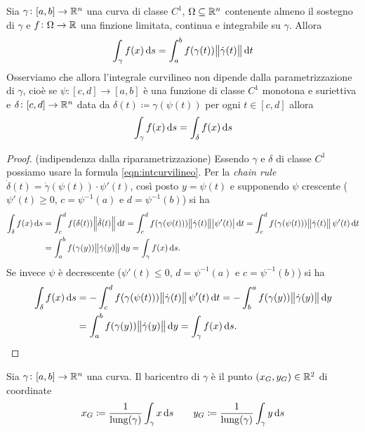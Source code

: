 \begin{thm}
	Sia $ \gamma \colon [a, b] \to \mathbb{R}^n $ una curva di classe $ C^1 $, $ \Omega \subseteq \mathbb{R}^n $ contenente almeno il sostegno di $ \gamma $ e $ f \colon \Omega \to \mathbb{R} $ una finzione limitata, continua e integrabile su $ \gamma $. Allora
	\begin{equation} \label{eqn:intcurvilineo}
		\int_{\gamma} f(x) \dif{s} = \int_{a}^{b} f(\gamma(t)) \norm{\dot{\gamma}(t)} \dif{t}
	\end{equation}
	Osserviamo che allora l'integrale curvilineo non dipende dalla parametrizzazione di $ \gamma $, cioè se $ \psi \colon [c, d] \to [a, b] $ è una funzione di classe $ C^1 $ monotona e suriettiva e $ \delta \colon [c, d] \to \mathbb{R}^n $ data da $ \delta(t) \coloneqq \gamma(\psi(t)) $ per ogni $ t \in [c, d] $ allora
	\begin{equation}
		\int_{\gamma} f(x) \dif{s} = \int_{\delta} f(x) \dif{s}
	\end{equation}
\end{thm}
%
\begin{proof}
	(indipendenza dalla riparametrizzazione)
	Essendo $ \gamma $ e $ \delta $ di classe $ C^1 $ possiamo usare la formula \eqref{eqn:intcurvilineo}. Per la \emph{chain rule} $ \dot{\delta}(t) = \dot{\gamma}(\psi(t)) \cdot \psi'(t) $, così posto $ y = \psi(t) $ e supponendo $ \psi $ crescente ($ \psi'(t) \geq 0 $, $ c = \psi^{-1}(a) $ e $ d = \psi^{-1}(b) $) si ha
	\begin{align*}
		\int_{\delta} f(x) \dif{s} & = \int_{c}^{d} f(\delta(t))\norm{\dot{\delta}(t)} \dif{t} = \int_{c}^{d} f(\gamma{(\psi(t))}) \norm{\dot{\gamma}(t)} \abs{\psi'(t)} \dif{t} = \int_{c}^{d} f(\gamma{(\psi(t))}) \norm{\dot{\gamma}(t)} \psi'(t) \dif{t} \\
		& = \int_{a}^{b} f(\gamma(y)) \norm{\dot{\gamma}(y)} \dif{y} = \int_{\gamma} f(x) \dif{s}.
	\end{align*}
	Se invece $ \psi $ è decrescente ($ \psi'(t) \leq 0 $, $ d = \psi^{-1}(a) $ e $ c = \psi^{-1}(b) $) si ha
	\begin{align*}
		\int_{\delta} f(x) \dif{s} & = -\int_{c}^{d} f(\gamma{(\psi(t))}) \norm{\dot{\gamma}(t)} \psi'(t) \dif{t} = - \int_{b}^{a} f(\gamma(y)) \norm{\dot{\gamma}(y)} \dif{y} \\
		& = \int_{a}^{b} f(\gamma(y)) \norm{\dot{\gamma}(y)} \dif{y} = \int_{\gamma} f(x) \dif{s}. \qedhere
	\end{align*}
\end{proof}


\begin{definition}
	Sia $ \gamma \colon [a, b] \to \mathbb{R}^n $ una curva. Il baricentro di $ \gamma $ è il punto $ (x_G, y_G) \in \mathbb{R}^2 $ di coordinate
	\begin{equation}
		x_G \coloneqq \frac{1}{\mathrm{lung}(\gamma)} \int_{\gamma} x \dif{s} \qquad y_G \coloneqq \frac{1}{\mathrm{lung}(\gamma)} \int_{\gamma} y \dif{s}
	\end{equation}
\end{definition}

